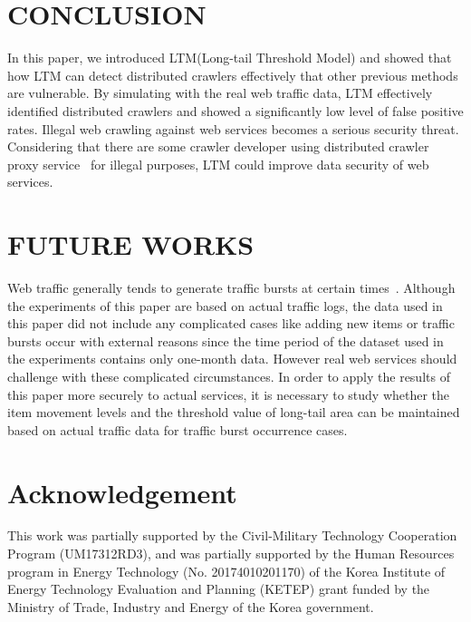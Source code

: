 \documentclass[sigconf,review]{acmart}
\begin{document}
%
%
\section{CONCLUSION}
In this paper, we introduced LTM(Long-tail Threshold Model) and showed that how LTM can detect distributed crawlers effectively that other previous methods are vulnerable. By simulating with the real web traffic data, LTM effectively identified distributed crawlers and showed a significantly low level of false positive rates. Illegal web crawling against web services becomes a serious security threat. Considering that there are some crawler developer using distributed crawler proxy service~\cite{r13} for illegal purposes, LTM could improve data security of web services.


%
%
\section{FUTURE WORKS}
Web traffic generally tends to generate traffic bursts at certain times~\cite{r3}. Although the experiments of this paper are based on actual traffic logs, the data used in this paper did not include any complicated cases like adding new items or traffic bursts occur with external reasons since the time period of the dataset used in the experiments contains only one-month data. However real web services should challenge with these complicated circumstances.
In order to apply the results of this paper more securely to actual services, it is necessary to study whether the item movement levels and the threshold value of long-tail area can be maintained based on actual traffic data for traffic burst occurrence cases.

\section*{Acknowledgement}
This work was partially supported by the Civil-Military Technology Cooperation Program (UM17312RD3), and was partially supported by the Human Resources program in Energy Technology (No. 20174010201170) of the Korea Institute of Energy Technology Evaluation and Planning (KETEP) grant funded by the Ministry of Trade, Industry and Energy of the Korea government.


\nocite{*}


\end{document}
